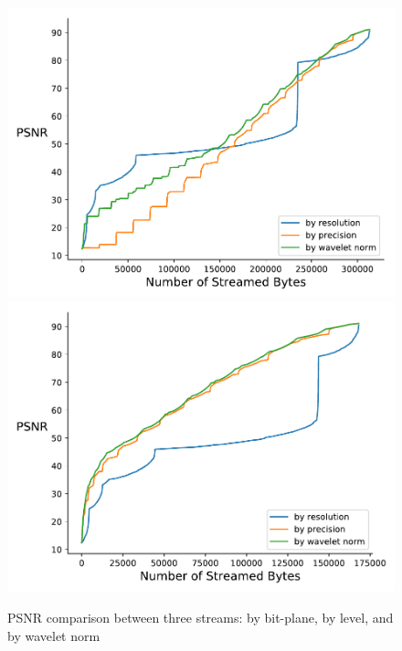 %
%

\begin{figure}[htb!]
	\centering
	{\includegraphics[width=0.4\linewidth]{img/independent/rmse-miranda-viscosity}}
	{\includegraphics[width=0.4\linewidth]{img/skip-zeros/rmse-miranda-viscosity}}
	\caption {PSNR comparison between three streams: by bit-plane, by level, and by wavelet norm}
	\label{fig:psnr_traditional_vs_by_norm_viscosity}
\end{figure}


